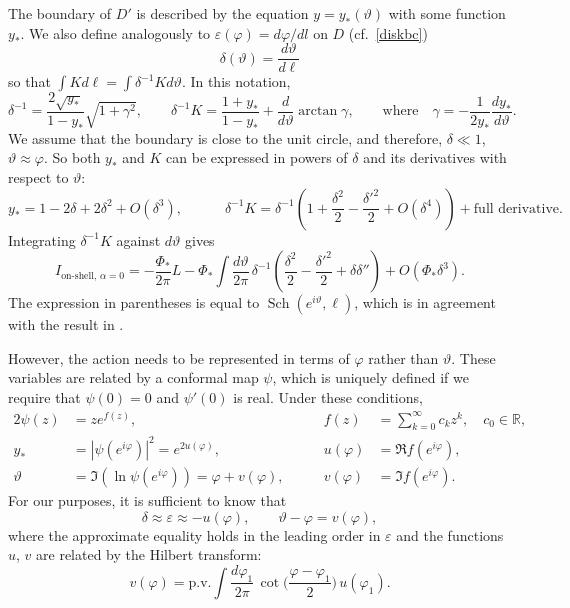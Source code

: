 \documentclass[12pt]{article}
\newcommand{\ph}{\varphi}
\newcommand{\RR}{\mathbb{R}}
\DeclareMathOperator{\Sch}{Sch}
\newcommand{\de}{\delta}
\newcommand{\vt}{\vartheta}
\newcommand{\vep}{\varepsilon}
\newcommand{\vp}{\varphi}
\def\cf{cf.\ }
\begin{document}
The boundary of $D'$ is described by the equation $y=y_*(\vt)$ with some function $y_*$. We also define analogously to $\vep(\vp)=d\vp/dl$ on $D$ (\cf \eqref{diskbc}) 
\begin{equation}
\de(\vt)=\frac{d\vt}{d\ell}
\end{equation}
so that $\int K d\ell=\int \de^{-1}K d\vt$. In this notation,
\begin{equation}
\de^{-1}=\frac{2\sqrt{y_*}}{1-y_*}\sqrt{1+\gamma^2},\qquad
\de^{-1}K=\frac{1+y_*}{1-y_*}+\frac{d}{d\vt}\arctan\gamma,\qquad
\text{where}\quad \gamma=-\frac{1}{2y_*}\frac{dy_*}{d\vt}.
\end{equation}
We assume that the boundary is close to the unit circle, and therefore, $\de\ll 1$,\, $\vt\approx\vp$. So both $y_*$ and $K$ can be expressed in powers of $\de$ and its derivatives with respect to $\vt$:
\begin{equation}\label{ystar_K}
y_*=1-2\de+2\de^2+O\left(\de^3\right),\qquad\quad
\de^{-1}K=\de^{-1}\left(1+\frac{\de^2}{2}-\frac{\de'^2}{2}+O\left(\de^4\right)\right)
+\text{full derivative}.
\end{equation}
Integrating $\de^{-1}K$ against $d\vt$ gives
\begin{equation}\label{osdilact0}
I_{\text{on-shell},\,\alpha=0}
=-\frac{\Phi_*}{2\pi}L
-\Phi_{*}\int \frac{d\vt}{2\pi}\,\de^{-1}
\left(\frac{\de^2}{2}-\frac{\de'^2}{2}+\de\de''\right)
+O(\Phi_*\de^3).
\end{equation}
The expression in parentheses is equal to $\Sch(e^{i\vt},\ell)$, which is in agreement with the result in \cite{Jen16, MSY16, EMV16}.

However, the action needs to be represented in terms of $\vp$ rather than $\vt$. These variables are related by a conformal map $\psi$, which is uniquely defined if we require that $\psi(0)=0$ and $\psi'(0)$ is real. Under these conditions,\vspace{-5pt}
\begin{alignat}{2}
\psi(z)&=ze^{f(z)},\qquad &
f(z)&=\sum_{k=0}^{\infty}c_{k}z^{k},\quad c_0\in\RR,\\[2pt]
y_*&=|\psi(e^{i\vp})|^2=e^{2u(\vp)},\qquad &
u(\vp)&=\Re f(e^{i\vp}),\\[5pt]
\vt&=\Im(\ln\psi(e^{i\vp}))=\vp+v(\vp),\qquad &
v(\vp)&=\Im f(e^{i\vp}).
\end{alignat}
For our purposes, it is sufficient to know that
\begin{equation}
\de\approx\vep\approx-u(\vp),\qquad \vt-\vp=v(\vp),
\end{equation}
where the approximate equality holds in the leading order in $\vep$ and the functions $u$, $v$ are related by the Hilbert transform:
\begin{equation}
v(\ph)=\text{p.v.}\int\frac{d\ph_1}{2\pi}\,
\cot\biggl(\frac{\ph-\ph_1}{2}\biggr)\,u(\ph_1).
\end{equation}
\end{document}
